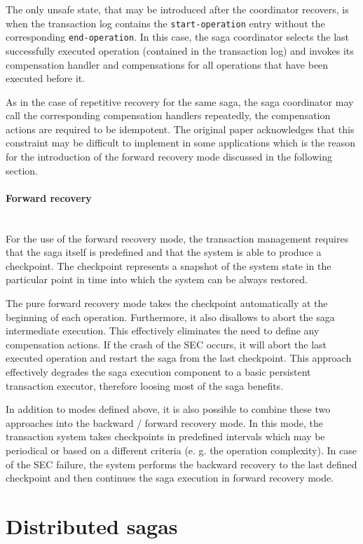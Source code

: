 \documentclass[oneside,
  digital, %
  table,   %
  lof,     %
  lot,     %
]{fithesis3}
\newcommand{\newlinepar}[1]{\paragraph{#1}\needspace{4\baselineskip}\mbox{}\\}
\begin{document}
The only unsafe state, that may be introduced after the coordinator recovers, is when the transaction log contains the \texttt{start-operation} entry without the corresponding \texttt{end-operation}. In this case, the saga coordinator selects the last successfully executed operation (contained in the transaction log) and invokes its compensation handler and compensations for all operations that have been executed before it.

As in the case of repetitive recovery for the same saga, the saga coordinator may call the corresponding compensation handlers repeatedly, the compensation actions are required to be idempotent. The original paper acknowledges that this constraint may be difficult to implement in some applications which is the reason for the introduction of the forward recovery mode discussed in the following section.

\newlinepar{Forward recovery}

For the use of the forward recovery mode, the transaction management requires that the saga itself is predefined and that the system is able to produce a checkpoint. The checkpoint represents a snapshot of the system state in the particular point in time into which the system can be always restored.

The pure forward recovery mode takes the checkpoint automatically at the beginning of each operation. Furthermore, it also disallows to abort the saga intermediate execution. This effectively eliminates the need to define any compensation actions. If the crash of the SEC occurs, it will abort the last executed operation and restart the saga from the last checkpoint. This approach effectively degrades the saga execution component to a basic persistent transaction executor, therefore loosing most of the saga benefits.

\hfill \break

In addition to modes defined above, it is also possible to combine these two approaches into the backward / forward recovery mode. In this mode, the transaction system takes checkpoints in predefined intervals which may be periodical or based on a different criteria (e. g. the operation complexity). In case of the SEC failure, the system performs the backward recovery to the last defined checkpoint and then continues the saga execution in forward recovery mode.

\section{Distributed sagas}
\end{document}

